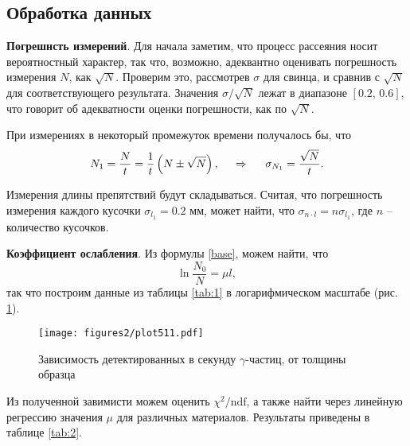 \subsection*{Обработка данных}


\textbf{Погрешнсть измерений}. Для начала заметим, что процесс рассеяния носит вероятностный характер, так что, возможно, адеквантно оценивать погрешность измерения $N$, как $\sqrt{N}$. Проверим это, рассмотрев $\sigma$  для свинца, и сравнив с $\sqrt{N}$ для соответствующего результата. Значения $\sigma / \sqrt{N}$ лежат в диапазоне $[0.2,\, 0.6]$, что говорит об адекватности оценки погрешности, как по $\sqrt{N}$.

При измерениях в некоторый промежуток времени получалось бы, что 
\begin{equation}
    N_1 = \frac{N}{t} = \frac{1}{t}\left(N \pm \sqrt{N}\right),
    \hspace{0.5cm} \Rightarrow \hspace{0.5cm}
    \sigma_{N_1} = \frac{\sqrt{N}}{t}.
    \label{err}
\end{equation}



Измерения длины препятствий будут складываться. Считая, что погрешность измерения каждого кусочки $\sigma_{l_1} = 0.2$ мм, может найти, что $\sigma_{n \cdot l} = n \sigma_{l_1}$,
где $n$ -- количество кусочков. 



\textbf{Коэффициент ослабления}. Из формулы \eqref{base}, можем найти, что
\begin{equation*}
    \ln \frac{N_0}{N} = \mu l,
\end{equation*}
так что построим данные из таблицы \ref{tab:1} в логарифмическом масштабе (рис. \ref{fig:1}).

\vspace{-1cm}

\begin{figure}[h]
    \centering
    \texttt{[image: figures2/plot511.pdf]}
    \caption{Зависимость детектированных в секунду $\gamma$-частиц, от толщины образца}
    \label{fig:1}
\end{figure}


Из полученной завимисти можем оценить $\chi^2/\text{ndf}$, а также найти через линейную регрессию значения $\mu$ для различных материалов. Результаты приведены в таблице \ref{tab:2}.





